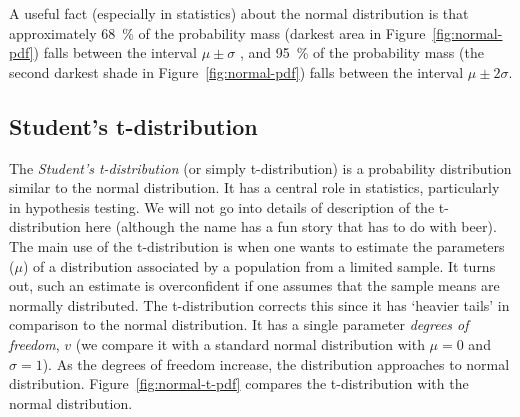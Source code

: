 
A useful fact (especially in statistics)
about the normal distribution is that
approximately \SI{68}{\percent} of the probability mass
(darkest area in Figure~\ref{fig:normal-pdf})
falls between the interval $\mu \pm\sigma$ ,
and \SI{95}{\percent} of the probability mass
(the second darkest shade in Figure~\ref{fig:normal-pdf})
falls between the interval  $\mu \pm 2\sigma$.


\subsection{Student's t-distribution}

The \emph{Student's t-distribution} (or simply t-distribution) is
a probability distribution similar to the normal distribution.
It has a central role in statistics,
particularly in hypothesis testing.
We will not go into details of description of the t-distribution here
(although the name has a fun story that has to do with beer).
The main use of the t-distribution is when one wants to estimate
the parameters ($\mu$) of a distribution associated by
a population from a limited sample.
It turns out,
such an estimate is overconfident if one assumes
that the sample means are normally distributed.
The t-distribution corrects this since it has `heavier tails'
in comparison to the normal distribution.
It has a single parameter \emph{degrees of freedom}, $v$
(we compare it with a standard normal distribution
with $\mu = 0$ and $\sigma = 1$).
As the degrees of freedom increase,
the distribution approaches to normal distribution.
Figure~\ref{fig:normal-t-pdf} compares 
the t-distribution with the normal distribution.
